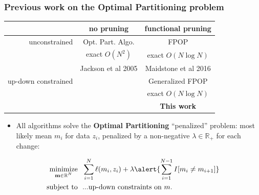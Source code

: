 \documentclass{beamer}
\DeclareMathOperator*{\minimize}{minimize}
\newcommand{\RR}{\mathbb R}
\begin{document}
\begin{frame}
  \frametitle{Previous work on the Optimal Partitioning problem}
  \begin{tabular}{r|c|c}
    & no pruning & functional pruning \\
    \hline
    unconstrained & Opt. Part. Algo. & FPOP \\
     & exact $O(N^2)$ & exact $O(N\log N)$\\
    & Jackson et al 2005 & Maidstone et al 2016\\
    \hline
    up-down constrained &  & Generalized FPOP \\
     &  & exact $O(N\log N)$\\
    &  & \textbf{This work}\\
    \hline
  \end{tabular}
  \begin{itemize}
  \item All algorithms solve the \textbf{Optimal Partitioning}
    ``penalized'' problem: most likely mean $m_i$ for data $z_i$,
    penalized by a non-negative $\lambda\in\RR_+$ for each change:
  \end{itemize}
\begin{align*}
    \minimize_{\substack{
  \mathbf m\in\RR^{N}
  }} &\ \ 
    \sum_{i=1}^N \ell( m_i,  z_i)  + \lambda\alert{\sum_{i=1}^{N-1}I[m_{i}\neq m_{i+1}]}
\\
      \text{subject to} &\ \ \text{...up-down constraints on $m$.}
  \nonumber 
\end{align*}
\end{frame}
\end{document}
